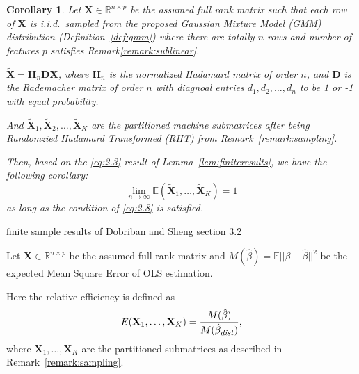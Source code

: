 \documentclass{beamer}
\newtheorem{cor}{Corollary}
\theoremstyle{remark}
\begin{document}
\begin{frame}
\begin{cor}
  \label{cor:main}
  Let $\mathbf{X}\in\mathbb{R}^{n\times p}$ be the assumed full rank matrix such that each row of $\mathbf{X}$ is i.i.d.\ sampled from the proposed Gaussian Mixture Model (GMM) distribution (Definition~\ref{def:gmm}) where there are totally $n$ rows and number of features $p$ satisfies Remark\ref{remark:sublinear}.

  $\mathbf{\tilde{X}} = \mathbf{H}_n\mathbf{D}\mathbf{X}$, where $\mathbf{H}_n$ is the normalized Hadamard matrix of order $n$, and $\mathbf{D}$ is the Rademacher matrix of order $n$ with diagnoal entries $d_1, d_2, \ldots, d_n$ to be 1 or -1 with equal probability.

  And $\mathbf{\tilde{X}}_{1}, \mathbf{\tilde{X}}_{2}, \ldots, \mathbf{\tilde{X}}_{K}$ are the partitioned machine submatrices after being Randomzied Hadamard Transformed (RHT) from Remark~\ref{remark:sampling}.

  Then, based on the \ref{eq:2.3} result of Lemma~\ref{lem:finiteresults}, we have the following corollary:
  \[
    \lim_{n\to\infty}\mathbb{E}(\mathbf{\tilde{X}}_1,\ldots,\mathbf{\tilde{X}}_K) = 1
  \]
  as long as the condition of \ref{eq:2.8} is satisfied.
  \end{cor}
\end{frame}

\begin{frame}{finite sample results of Dobriban and Sheng \cite{dobriban2022distributedlinearregressionaveraging} section 3.2}
\begin{lemma}
  \label{lem:finiteresults}

    Let \(\mathbf{X}\in\mathbb{R}^{n\times p}\) be the assumed full rank matrix and $M(\hat{\beta}) = \mathbb{E}||\beta - \hat{\beta}||^2$ be the expected Mean Square Error of OLS estimation.
    
    Here the relative efficiency is defined as 
    \[
    E(\mathbf{X}_1,\dots,\mathbf{X}_K) = \frac{M(\hat{\beta})}{M(\hat{\beta}_{\text{\footnotesize \textit{dist}}})},
    \]
    where \({\mathbf{X}}_{1}, \ldots, {\mathbf{X}}_{K}\) are the partitioned submatrices as described in Remark~\ref{remark:sampling}.
    \end{lemma}
\end{frame}
\end{document}
